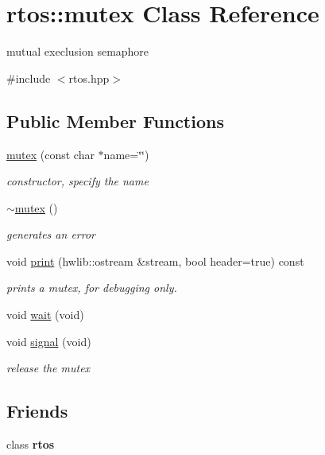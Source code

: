 \hypertarget{classrtos_1_1mutex}{}\section{rtos\+:\+:mutex Class Reference}
\label{classrtos_1_1mutex}


mutual execlusion semaphore  




{\ttfamily \#include $<$rtos.\+hpp$>$}

\subsection*{Public Member Functions}
\begin{DoxyCompactItemize}
\item 
\hyperlink{classrtos_1_1mutex_ac406598aa3b34c199c6d4914de392180}{mutex} (const char $\ast$name=\char`\"{}\char`\"{})
\begin{DoxyCompactList}\small\item\em constructor, specify the name \end{DoxyCompactList}\item 
\hyperlink{classrtos_1_1mutex_ae86a7dd916b263079e1afd3a1dbbd4e9}{$\sim$mutex} ()
\begin{DoxyCompactList}\small\item\em generates an error \end{DoxyCompactList}\item 
void \hyperlink{classrtos_1_1mutex_a43b6d7a55176945f59598f825a5acd65}{print} (hwlib\+::ostream \&stream, bool header=true) const \hypertarget{classrtos_1_1mutex_a43b6d7a55176945f59598f825a5acd65}{}\label{classrtos_1_1mutex_a43b6d7a55176945f59598f825a5acd65}

\begin{DoxyCompactList}\small\item\em prints a mutex, for debugging only. \end{DoxyCompactList}\item 
void \hyperlink{classrtos_1_1mutex_af005eb2964192bbdf1a444eab11eb683}{wait} (void)
\item 
void \hyperlink{classrtos_1_1mutex_ad57303013f03da5856e54f331323dc5d}{signal} (void)
\begin{DoxyCompactList}\small\item\em release the mutex \end{DoxyCompactList}\end{DoxyCompactItemize}
\subsection*{Friends}
\begin{DoxyCompactItemize}
\item 
class {\bfseries rtos}\hypertarget{classrtos_1_1mutex_a2a7bcfc34141352757ad672e3ecd099f}{}\label{classrtos_1_1mutex_a2a7bcfc34141352757ad672e3ecd099f}

\end{DoxyCompactItemize}


